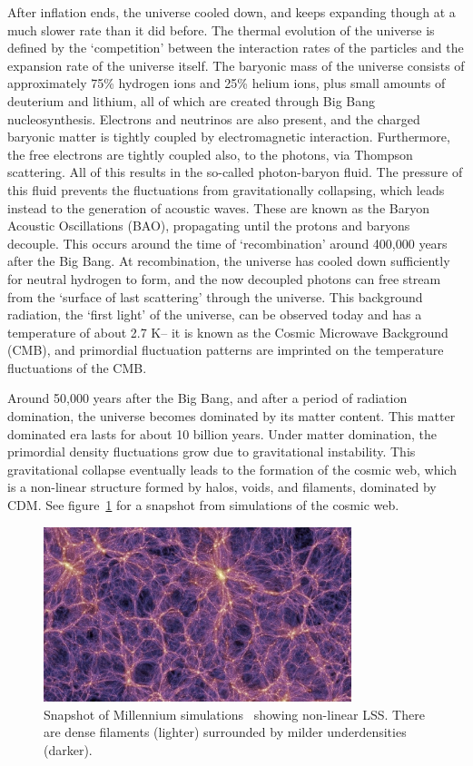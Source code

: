 After inflation ends, the universe cooled down, and keeps expanding though at a much slower rate than it did before. The thermal evolution of the universe is defined by the `competition' between the interaction rates of the particles and the expansion rate of the universe itself. The baryonic mass of the universe consists of approximately 75\% hydrogen ions and 25\% helium ions, plus small amounts of deuterium and lithium, all of which are created through Big Bang nucleosynthesis. Electrons and neutrinos are also present, and the charged baryonic matter is tightly coupled by electromagnetic interaction. Furthermore, the free electrons are tightly coupled also, to the photons, via Thompson scattering. All of this results in the so-called photon-baryon fluid. The pressure of this fluid prevents the fluctuations from gravitationally collapsing, which leads instead to the generation of acoustic waves. These are known as the Baryon Acoustic Oscillations (BAO), propagating until the protons and baryons decouple. This occurs around the time of `recombination' around 400,000 years after the Big Bang. At recombination, the universe has cooled down sufficiently for neutral hydrogen to form, and the now decoupled photons can free stream from the `surface of last scattering' through the universe. This background radiation, the `first light' of the universe, can be observed today and has a temperature of about 2.7 K-- it is known as the Cosmic Microwave Background (CMB), and primordial fluctuation patterns are imprinted on the temperature fluctuations of the CMB. 

Around 50,000 years after the Big Bang, and after a period of radiation domination, the universe becomes dominated by its matter content. This matter dominated era lasts for about 10 billion years. Under matter domination, the primordial density fluctuations grow due to gravitational instability. This gravitational collapse eventually leads to the formation of the cosmic web, which is a non-linear structure formed by halos, voids, and filaments, dominated by CDM. See figure~\ref{fig:millennium} for a snapshot from simulations of the cosmic web. 

\begin{figure}[ht!]
	\centering
	\includegraphics[width=0.8\textwidth]{fig/Millennium.png}
	\caption{Snapshot of Millennium simulations~\cite{Springel:2005nw} showing non-linear LSS. There are dense filaments (lighter) surrounded by milder underdensities (darker). }
	\label{fig:millennium}
\end{figure}

